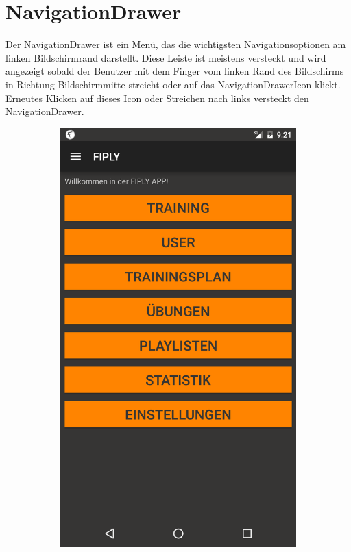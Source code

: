 \documentclass[FIPLY_base.tex]{subfiles}
\begin{document}
\section{NavigationDrawer}
Der NavigationDrawer ist ein Menü, das die wichtigsten Navigationsoptionen am linken Bildschirmrand darstellt.
Diese Leiste ist meistens versteckt und wird angezeigt sobald der Benutzer mit dem Finger vom linken Rand des Bildschirms in Richtung Bildschirmmitte streicht oder auf das NavigationDrawerIcon klickt.
Erneutes Klicken auf dieses Icon oder Streichen nach links versteckt den NavigationDrawer. 
\ \\
\begin{figure}[h]
	\begin{subfigure}[b]{0.3\textwidth}
	\includegraphics[scale=0.15]{img/NavDrawerClosed}

\end{subfigure}
\end{figure}
\end{document}
